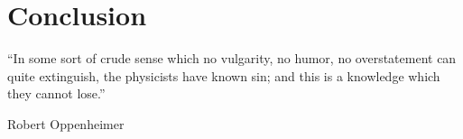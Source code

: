 
\chapter{Conclusion}
\label{chp:conclusion}
\epigraph{“In some sort of crude sense which no vulgarity, no humor, no overstatement can quite extinguish, the physicists have known sin; and this is a knowledge which they cannot lose.”}{Robert Oppenheimer}